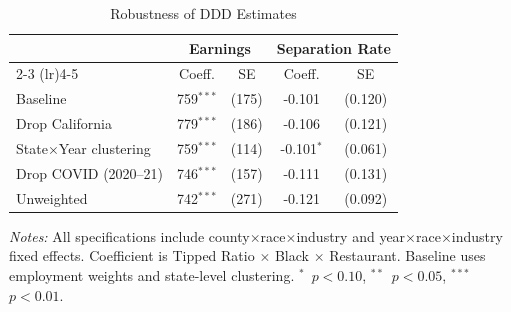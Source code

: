 
\begin{table}[t]
\centering
\caption{Robustness of DDD Estimates}
\label{tab:robustness}
\begin{tabular}{lcccc}
\toprule
 & \multicolumn{2}{c}{Earnings} & \multicolumn{2}{c}{Separation Rate} \\
 \cmidrule(lr){2-3} \cmidrule(lr){4-5}
 & Coeff. & SE & Coeff. & SE \\
\midrule
Baseline & 759$^{***}$ & (175) & -0.101 & (0.120) \\
Drop California & 779$^{***}$ & (186) & -0.106 & (0.121) \\
State$\times$Year clustering & 759$^{***}$ & (114) & -0.101$^{*}$ & (0.061) \\
Drop COVID (2020--21) & 746$^{***}$ & (157) & -0.111 & (0.131) \\
Unweighted & 742$^{***}$ & (271) & -0.121 & (0.092) \\
\bottomrule
\end{tabular}
\begin{tablenotes}
\small
\item \textit{Notes:} All specifications include county$\times$race$\times$industry and year$\times$race$\times$industry fixed effects. Coefficient is Tipped Ratio $\times$ Black $\times$ Restaurant. Baseline uses employment weights and state-level clustering. $^{*}$~$p<0.10$, $^{**}$~$p<0.05$, $^{***}$~$p<0.01$.
\end{tablenotes}
\end{table}
